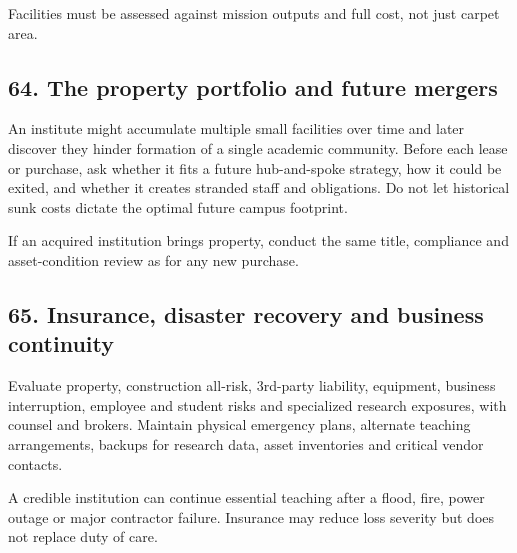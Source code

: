 Facilities must be assessed against mission outputs and full cost, not just carpet area.


\subsection{64. The property portfolio and future mergers}

An institute might accumulate multiple small facilities over time and later discover they hinder formation of a single academic community. Before each lease or purchase, ask whether it fits a future hub-and-spoke strategy, how it could be exited, and whether it creates stranded staff and obligations. Do not let historical sunk costs dictate the optimal future campus footprint.

If an acquired institution brings property, conduct the same title, compliance and asset-condition review as for any new purchase.


\subsection{65. Insurance, disaster recovery and business continuity}

Evaluate property, construction all-risk, 3rd-party liability, equipment, business interruption, employee and student risks and specialized research exposures, with counsel and brokers. Maintain physical emergency plans, alternate teaching arrangements, backups for research data, asset inventories and critical vendor contacts.

A credible institution can continue essential teaching after a flood, fire, power outage or major contractor failure. Insurance may reduce loss severity but does not replace duty of care.

